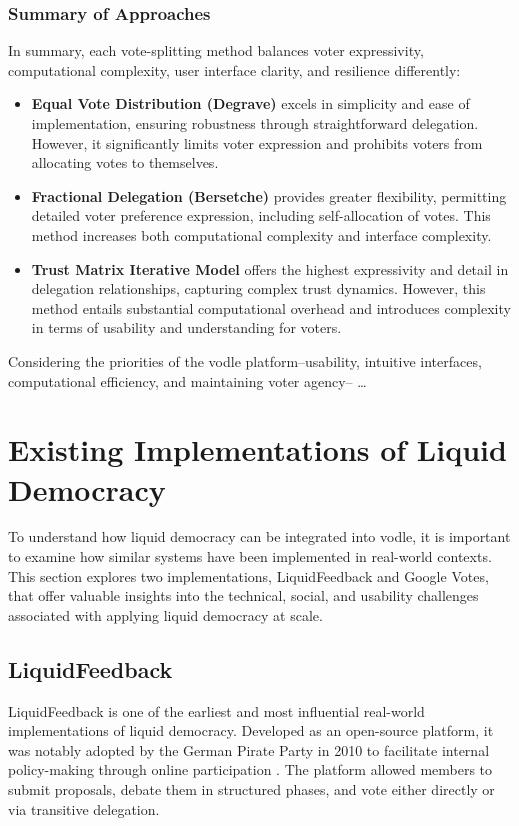 \subsubsection*{Summary of Approaches}
In summary, each vote-splitting method balances voter expressivity, computational complexity, user interface clarity, and resilience differently:
\begin{itemize}
  \item \textbf{Equal Vote Distribution (Degrave)} excels in simplicity and ease of implementation, ensuring robustness through straightforward delegation. However, it significantly limits voter expression and prohibits voters from allocating votes to themselves.
  \item \textbf{Fractional Delegation (Bersetche)} provides greater flexibility, permitting detailed voter preference expression, including self-allocation of votes. This method increases both computational complexity and interface complexity.
  \item \textbf{Trust Matrix Iterative Model} offers the highest expressivity and detail in delegation relationships, capturing complex trust dynamics. However, this method entails substantial computational overhead and introduces complexity in terms of usability and understanding for voters.
\end{itemize}

Considering the priorities of the vodle platform--usability, intuitive interfaces, computational efficiency, and maintaining voter agency-- \dots


\section{Existing Implementations of Liquid Democracy}
To understand how liquid democracy can be integrated into vodle, it is important to examine how similar systems have been implemented in real-world contexts. 
This section explores two implementations, LiquidFeedback and Google Votes, that offer valuable insights into the technical, social, and usability challenges associated with applying liquid democracy at scale.
\subsection{LiquidFeedback}
LiquidFeedback is one of the earliest and most influential real-world implementations of liquid democracy. Developed as an open-source platform, it was notably adopted by the German Pirate Party in 2010 to facilitate internal policy-making through online participation \citep{behrens_liquidfeedback_2014}. The platform allowed members to submit proposals, debate them in structured phases, and vote either directly or via transitive delegation.

